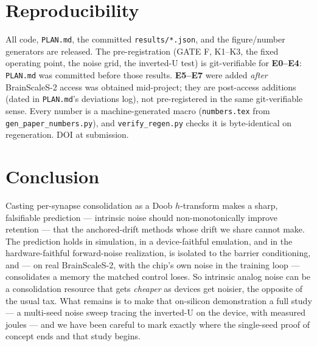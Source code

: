 \documentclass[11pt]{article}
\begin{document}
\section{Reproducibility}
All code, \texttt{PLAN.md}, the committed \texttt{results/*.json}, and the
figure/number generators are released. The pre-registration (GATE F, K1--K3, the
fixed operating point, the noise grid, the inverted-U test) is git-verifiable for
\textbf{E0--E4}: \texttt{PLAN.md} was committed before those results. \textbf{E5--E7}
were added \emph{after} BrainScaleS-2 access was obtained mid-project; they are
post-access additions (dated in \texttt{PLAN.md}'s deviations log), not
pre-registered in the same git-verifiable sense. Every number is a machine-generated
macro (\texttt{numbers.tex} from \texttt{gen\_paper\_numbers.py}), and
\texttt{verify\_regen.py} checks it is byte-identical on regeneration. DOI at
submission.

\section{Conclusion}
Casting per-synapse consolidation as a Doob $h$-transform makes a sharp, falsifiable
prediction --- intrinsic noise should non-monotonically improve retention --- that
the anchored-drift methods whose drift we share cannot make. The prediction holds in
simulation, in a device-faithful emulation, and in the hardware-faithful forward-noise
realization, is isolated to the barrier conditioning, and --- on real BrainScaleS-2,
with the chip's own noise in the training loop --- consolidates a memory the matched
control loses. So intrinsic analog noise can be a consolidation resource that gets
\emph{cheaper} as devices get noisier, the opposite of the usual tax. What remains is
to make that on-silicon demonstration a full study --- a multi-seed noise sweep
tracing the inverted-U on the device, with measured joules --- and we have been
careful to mark exactly where the single-seed proof of concept ends and that study
begins.

\small


\end{document}
